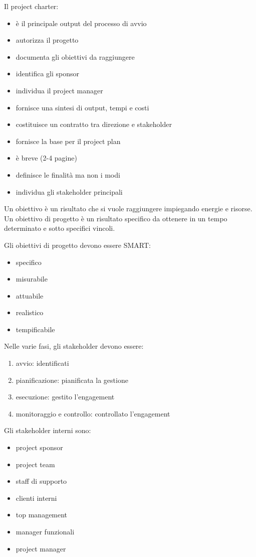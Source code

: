 \documentclass[answers, a4paper, 11pt]{exam}
\begin{document}
Il project charter:

\begin{itemize}
    \item è il principale output del processo di avvio
    \item autorizza il progetto
    \item documenta gli obiettivi da raggiungere
    \item identifica gli sponsor
    \item individua il project manager
    \item fornisce una sintesi di output, tempi e costi
    \item costituisce un contratto tra direzione e stakeholder
    \item fornisce la base per il project plan
    \item è breve (2-4 pagine)
    \item definisce le finalità ma non i modi
    \item individua gli stakeholder principali
\end{itemize}

Un obiettivo è un risultato che si vuole raggiungere impiegando energie e risorse. Un obiettivo di progetto è un risultato specifico da ottenere in un tempo determinato e sotto specifici vincoli.

Gli obiettivi di progetto devono essere SMART:

\begin{itemize}
    \item specifico
    \item misurabile
    \item attuabile
    \item realistico
    \item tempificabile
\end{itemize}

Nelle varie fasi, gli stakeholder devono essere:

\begin{enumerate}
    \item avvio: identificati
    \item pianificazione: pianificata la gestione
    \item esecuzione: gestito l'engagement
    \item monitoraggio e controllo: controllato l'engagement
\end{enumerate}

Gli stakeholder interni sono:

\begin{itemize}
    \item project sponsor
    \item project team
    \item staff di supporto
    \item clienti interni
    \item top management
    \item manager funzionali
    \item project manager
\end{itemize}
\end{document}
